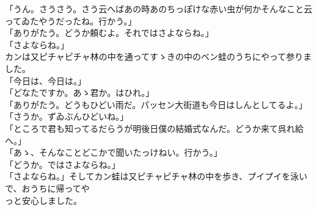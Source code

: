 \documentclass[
a4paper,
10pt,
book]
{tarticle}
\begin{document}
\newpage
\setcounter{page}{15}
\thispagestyle{fancy}

\begin{linenumbers}
    「うん。さうさう。さう云へばあの時あのちっぽけな赤い虫が何かそんなこと云ってゐたやうだったね。行かう。」\\
    「ありがたう。どうか頼むよ。それではさよならね。」\\
    「さよならね。」\\
    \indent カンは又ピチャピチャ林の中を通ってすゝきの中のベン蛙のうちにやって参りました。\\
    「今日は、今日は。」\\
    「どなたですか。あゝ君か。はひれ。」\\
    「ありがたう。どうもひどい雨だ。パッセン大街道も今日はしんとしてるよ。」\\
    「さうか。ずゐぶんひどいね。」\\
    「ところで君も知ってるだらうが明後日僕の結婚式なんだ。どうか来て呉れ給へ。」\\
    「あゝ、そんなことどこかで聞いたっけねい。行かう。」\\
    「どうか。ではさよならね。」\\
    「さよならね。」そしてカン蛙は又ピチャピチャ林の中を歩き、プイプイを泳いで、おうちに帰ってや\\っと安心しました。
\end{linenumbers}
\end{document}
